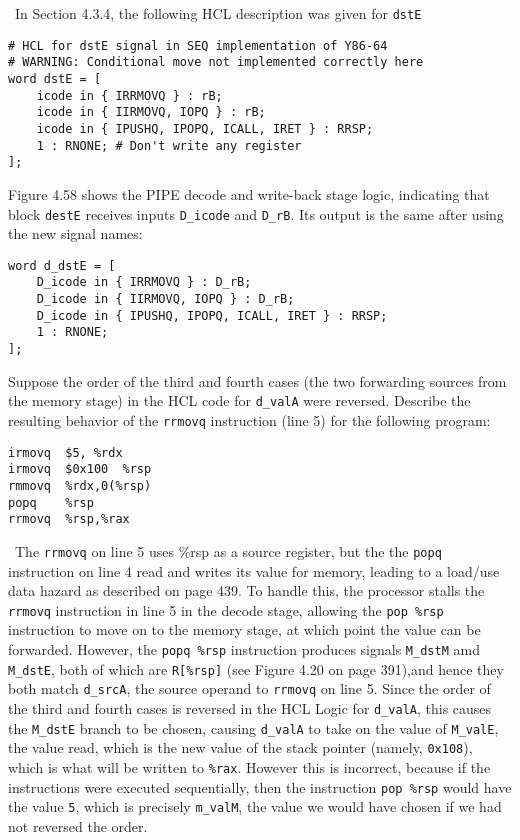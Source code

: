\documentclass[12pt]{article}
\newenvironment{ex}[2][Exercise]{\begin{trivlist}
		\item[\hskip \labelsep {\bfseries #1}\hskip \labelsep {\bfseries #2.}]}{\end{trivlist}}
\newenvironment{sol}[1][Solution]{\begin{trivlist}
		\item[\hskip \labelsep {\bfseries #1:}]}{\end{trivlist}}
\begin{document}
\begin{sol}
	\
	In Section 4.3.4, the following HCL description was given for \texttt{dstE}
	\begin{lstlisting}[language={}]
# HCL for dstE signal in SEQ implementation of Y86-64
# WARNING: Conditional move not implemented correctly here
word dstE = [
	icode in { IRRMOVQ } : rB;
	icode in { IIRMOVQ, IOPQ } : rB;
	icode in { IPUSHQ, IPOPQ, ICALL, IRET } : RRSP;
	1 : RNONE; # Don't write any register
];
	\end{lstlisting}
	Figure 4.58 shows the PIPE decode and write-back stage logic, indicating that
	block \texttt{destE} receives inputs \texttt{D\_icode} and \texttt{D\_rB}.
	Its output is the same after using the new signal names:
	\begin{lstlisting}[language={}]
word d_dstE = [
	D_icode in { IRRMOVQ } : D_rB;
	D_icode in { IIRMOVQ, IOPQ } : D_rB;
	D_icode in { IPUSHQ, IPOPQ, ICALL, IRET } : RRSP;
	1 : RNONE;
];
	\end{lstlisting}
\end{sol}

\begin{ex}{4.32}
	Suppose the order of the third and fourth cases (the two forwarding sources from
	the memory stage) in the HCL code for \texttt{d\_valA} were reversed. Describe
	the resulting behavior of the \texttt{rrmovq} instruction (line 5) for the following
	program:
	\begin{lstlisting}[language={}]
irmovq	$5,	%rdx
irmovq	$0x100	%rsp
rmmovq	%rdx,0(%rsp)
popq	%rsp
rrmovq	%rsp,%rax
	\end{lstlisting}
\end{ex}

\begin{sol}
	\	
	The \texttt{rrmovq} on line 5 uses \%rsp as a source register, but the the \texttt{popq}
	instruction on line 4 read and writes its value for memory, leading to a load/use
	data hazard as described on page 439. To handle this, the processor stalls the
	\texttt{rrmovq} instruction in line 5 in the decode stage, allowing the
	\texttt{pop \%rsp} instruction to move on to the memory stage, at which point the value
	can be forwarded. However, the \texttt{popq \%rsp} instruction produces
	signals \texttt{M\_dstM} amd \texttt{M\_dstE}, both of which are \texttt{R[\%rsp]}
	(see Figure 4.20 on page 391),and hence they both match \texttt{d\_srcA}, the
	source operand to \texttt{rrmovq} on line 5. Since the order of the third
	and fourth cases is reversed in the HCL Logic for \texttt{d\_valA}, this
	causes the \texttt{M\_dstE} branch to be chosen, causing \texttt{d\_valA}
	to take on the value of \texttt{M\_valE}, the value read, which is the new
	value of the stack pointer (namely, \texttt{0x108}), which is what will
	be written to \texttt{\%rax}. However this is incorrect, because if the instructions
	were executed sequentially, then the instruction \texttt{pop \%rsp} would have
	the value \texttt{5}, which is precisely \texttt{m\_valM}, the value we would
	have chosen if we had not reversed the order.
\end{sol}
\end{document}
